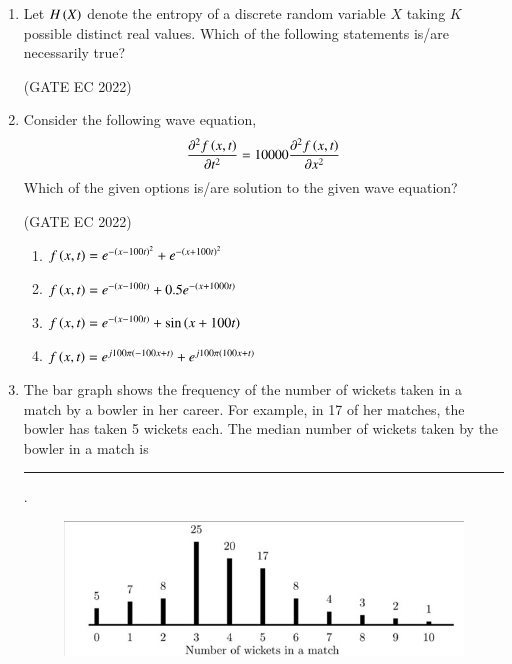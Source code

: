 \documentclass[journal,12pt,onecolumn]{IEEEtran}
\theoremstyle{remark}
\begin{document}
\begin{enumerate}
    \item Let $H\left(X\right)$ denote the entropy of a discrete random variable $X$ taking $K$ possible distinct real values. Which of the following statements is/are necessarily true?

    \hfill{(GATE EC 2022)}
    \begin{enumerate}
    \end{enumerate}

    \item Consider the following wave equation,
    \begin{align*}
        \frac{\partial^2 f\left(x,t\right)}{\partial t^2} = 10000 \frac{\partial^2 f\left(x,t\right)}{\partial x^2}
    \end{align*}
    Which of the given options is/are solution to the given wave equation?

    \hfill{(GATE EC 2022)}
    \begin{enumerate}
        \item $f\left(x,t\right) = e^{-\left(x-100t\right)^2} + e^{-\left(x+100t\right)^2}$
        \item $f\left(x,t\right) = e^{-\left(x-100t\right)} + 0.5 e^{-\left(x+1000t\right)}$
        \item $f\left(x,t\right) = e^{-\left(x-100t\right)} + \sin\left(x+100t\right)$
        \item $f\left(x,t\right) = e^{j100\pi\left(-100x+t\right)} + e^{j100\pi\left(100x+t\right)}$
    \end{enumerate}

    \item The bar graph shows the frequency of the number of wickets taken in a match by a bowler in her career. For example, in 17 of her matches, the bowler has taken 5 wickets each. The median number of wickets taken by the bowler in a match is \rule{2cm}{0.4pt} .
    \begin{figure}[H]
        \centering
        \includegraphics[width=0.5\columnwidth]{figs/m14.jpg}
        \caption*{}
        \label{fig:m14}
    \end{figure}


\end{enumerate}
\end{document}
